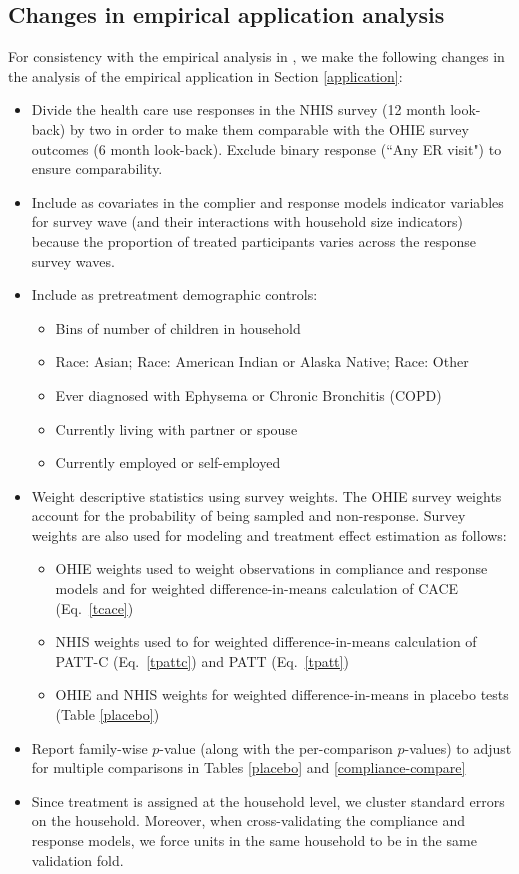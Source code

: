 \documentclass[hidelinks,12pt,letterpaper]{article}
\begin{document}
\subsection{Changes in empirical application analysis}

For consistency with the empirical analysis in \citet{finkelstein2012}, we make the following changes in the analysis of the empirical application in Section \ref{application}:

\begin{itemize}
	\item Divide the health care use responses in the NHIS survey (12 month look-back) by two in order to make them comparable with the OHIE survey outcomes (6 month look-back). Exclude binary response (``Any ER visit") to ensure comparability. 
	\item Include as covariates in the complier and response models indicator variables for survey wave (and their interactions with household size indicators) because the proportion of treated participants varies across the response survey waves.
	\item Include as pretreatment demographic controls:
	\begin{itemize}
		\item Bins of number of children in household
		\item Race: Asian; Race: American Indian or Alaska Native; Race: Other
		\item Ever diagnosed with Ephysema or Chronic Bronchitis (COPD)
		\item Currently living with partner or spouse
		\item Currently employed or self-employed
	\end{itemize}
	\item Weight descriptive statistics using survey weights. The OHIE survey weights account for the probability of being sampled and non-response. Survey weights are also used for modeling and treatment effect estimation as follows:
		\begin{itemize}
		\item OHIE weights used to weight observations in compliance and response models and for weighted difference-in-means calculation of CACE (Eq.~\eqref{tcace})
		\item NHIS weights used to for weighted difference-in-means calculation of PATT-C (Eq.~\eqref{tpattc}) and PATT (Eq.~\eqref{tpatt})
		\item OHIE and NHIS weights for weighted difference-in-means in placebo tests (Table \ref{placebo})
	\end{itemize}
	\item Report family-wise $p$-value (along with the per-comparison $p$-values) to adjust for multiple comparisons in Tables \ref{placebo} and \ref{compliance-compare}
	\item Since treatment is assigned at the household level, we cluster standard errors on the household. Moreover, when cross-validating the compliance and response models, we force units in the same household to be in the same validation fold. 
	
\end{itemize}

\clearpage
\printbibliography
\end{document}
